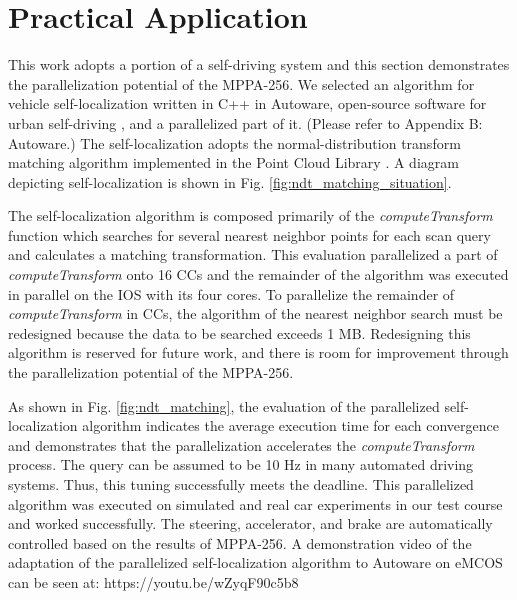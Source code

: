\section{Practical Application}
\label{sec:practical_application}
This work adopts a portion of a self-driving system and this section demonstrates the parallelization potential of the MPPA-256.
We selected an algorithm for vehicle self-localization written in C++ in Autoware, open-source software for urban self-driving \cite{autoware}, and a parallelized part of it.
(Please refer to Appendix B: Autoware.)
The self-localization adopts the normal-distribution transform matching algorithm \cite{magnusson2009three} implemented in the Point Cloud Library \cite{pcl}.
A diagram depicting self-localization is shown in Fig. \ref{fig:ndt_matching_situation}.


The self-localization algorithm is composed primarily of the \emph{computeTransform} function which searches for several nearest neighbor points for each scan query and calculates a matching transformation.
This evaluation parallelized a part of \emph{computeTransform} onto 16 CCs and the remainder of the algorithm was executed in parallel on the IOS with its four cores.
To parallelize the remainder of \emph{computeTransform} in CCs, the algorithm of the nearest neighbor search must be redesigned because the data to be searched exceeds 1 MB.
Redesigning this algorithm is reserved for future work, and there is room for improvement through the parallelization potential of the MPPA-256.

As shown in Fig. \ref{fig:ndt_matching}, the evaluation of the parallelized self-localization algorithm indicates the average execution time for each convergence and demonstrates that the parallelization accelerates the \emph{computeTransform} process.
The query can be assumed to be 10 Hz in many automated driving systems.
Thus, this tuning successfully meets the deadline.
This parallelized algorithm was executed on simulated and real car experiments in our test course and worked successfully.
The steering, accelerator, and brake are automatically controlled based on the results of MPPA-256.
A demonstration video of the adaptation of the parallelized self-localization algorithm to Autoware on eMCOS can be seen at: https://youtu.be/wZyqF90c5b8  


